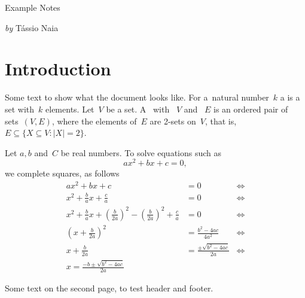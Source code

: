 \documentclass[11pt,oneside,article,extrafontsizes]{memoir}
\newcommand{\MyName}{T\'assio Naia}
\theoremstyle{definition}
\theoremstyle{remark}
\begin{document}
\begin{flushright}
  {\Large Example Notes}
  \medskip
  
  \textit{by} \MyName
\end{flushright}

\bigskip

\begin{abstract}
  Example of usage of maths template.
  I like margins and colours.
\end{abstract}

\chapter{Introduction}

Some text to show what the document looks like.
For a~natural number~$k$ a  is a set with~$k$ elements.
Let~$V$ be a set.
A~
with ~$V$
and ~$E$
is an ordered pair of sets~$(V,E)$,
where the elements of~$E$ are 2-sets on~$V$,
that is, $E\subseteq\bigl\{ X\subseteq V\colon |X|=2\bigr\}$.

Let $a,b$ and~$C$ be real numbers.
To solve equations such as
\begin{equation}\label{eq:2nd-degree}
  ax^2 + bx + c = 0,
\end{equation}
we complete squares, as follows
\begin{align}
  ax^2 + bx + c
  & = 0 &\iff\nonumber\\
  x^2 + \frac{b}{a}x + \frac{c}{a}
  & = 0 &\iff\nonumber\\
  x^2
  + \frac{b}{a}x
  + \left(\frac{b}{2a}\right)^2 -\left(\frac{b}{2a}\right)^2
  +\frac{c}{a}
  & = 0 &\iff\nonumber\\
  \left(x + \frac{b}{2a}\right)^2
  & = \frac{b^2 - 4ac}{4a^2}&\iff\nonumber\\
  x + \frac{b}{2a}
  & = \frac{\pm\sqrt{b^2 - 4ac}}{2a}&\iff\nonumber\\
  x = \frac{-b \pm \sqrt{b^2 -4ac}}{2a} \label{eq:bhaskara}
\end{align}

\clearpage

Some text on the second page, to test header and footer.
\end{document}
